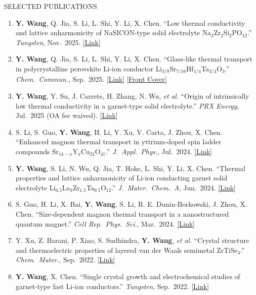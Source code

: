 \documentclass{resume} %
\begin{document}
\begin{rSection}{SELECTED PUBLICATIONS}
\begin{enumerate}
\itemsep 0.2em

\item \textbf{Y. Wang}, Q. Jia, S. Li, L. Shi, Y. Li, X. Chen.
``Low thermal conductivity and lattice anharmonicity of NaSICON-type solid electrolyte Na$_3$Zr$_2$Si$_2$PO$_{12}$.''
\textit{Tungsten}, Nov.\ 2025.
\href{https://doi.org/10.1007/s42864-025-00357-6}{[Link]}

\item \textbf{Y. Wang}, Q. Jia, S. Li, L. Shi, Y. Li, X. Chen.
``Glass-like thermal transport in polycrystalline perovskite Li-ion conductor Li$_{3/8}$Sr$_{7/16}$Hf$_{1/4}$Ta$_{3/4}$O$_3$.''
\textit{Chem.\ Commun.}, Sep.\ 2025.
\href{https://doi.org/10.1039/D5CC04693A}{[Link]}
\href{https://doi.org/10.1039/D5CC90366A}{[Front Cover]}

\item \textbf{Y. Wang}, Y. Su, J. Carrete, H. Zhang, N. Wu, \textit{et al.}
``Origin of intrinsically low thermal conductivity in a garnet-type solid electrolyte.''
\textit{PRX Energy}, Jul.\ 2025 (OA fee waived).
\href{https://doi.org/10.1103/6wj2-kzhh}{[Link]}

\item S. Li, S. Guo, \textbf{Y. Wang}, H. Li, Y. Xu, V. Carta, J. Zhou, X. Chen.
``Enhanced magnon thermal transport in yttrium-doped spin ladder compounds Sr$_{14-x}$Y$_x$Cu$_{24}$O$_{41}$.''
\textit{J.\ Appl.\ Phys.}, Jul.\ 2024.
\href{https://doi.org/10.1063/5.0214897}{[Link]}

\item \textbf{Y. Wang}, S. Li, N. Wu, Q. Jia, T. Hoke, L. Shi, Y. Li, X. Chen.
``Thermal properties and lattice anharmonicity of Li-ion conducting garnet solid electrolyte Li$_{6.5}$La$_3$Zr$_{1.5}$Ta$_{0.5}$O$_{12}$.''
\textit{J.\ Mater.\ Chem.\ A}, Jun.\ 2024.
\href{https://doi.org/10.1039/D4TA02264E}{[Link]}

\item S. Guo, H. Li, X. Bai, \textbf{Y. Wang}, S. Li, R. E. Dunin-Borkowski, J. Zhou, X. Chen.
``Size-dependent magnon thermal transport in a nanostructured quantum magnet.''
\textit{Cell Rep.\ Phys.\ Sci.}, Mar.\ 2024.
\href{https://doi.org/10.1016/j.xcrp.2024.101879}{[Link]}

\item Y. Xu, Z. Barani, P. Xiao, S. Sudhindra, \textbf{Y. Wang}, \textit{et al.}
``Crystal structure and thermoelectric properties of layered van der Waals semimetal ZrTiSe$_4$.''
\textit{Chem.\ Mater.}, Sep.\ 2022.
\href{https://doi.org/10.1021/acs.chemmater.2c02155}{[Link]}

\item \textbf{Y. Wang}, X. Chen.
``Single crystal growth and electrochemical studies of garnet-type fast Li-ion conductors.''
\textit{Tungsten}, Sep.\ 2022.
\href{https://doi.org/10.1007/s42864-022-00176-z}{[Link]}

\end{enumerate}
\end{rSection}
\end{document}
